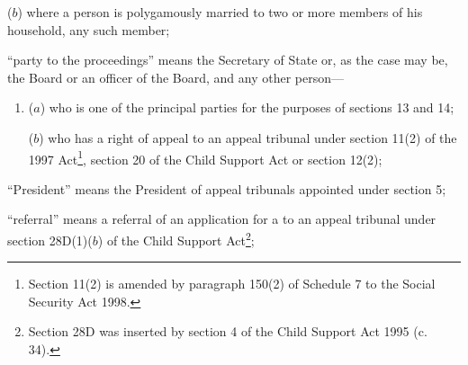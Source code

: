 \documentclass[12pt,a4paper]{article}
\begin{document}
\begin{enumerate}
\begin{enumerate}
    ($b$) 
    where a person is polygamously married to two or more members of his household, any such member;
\end{enumerate}

“party to the proceedings” means the Secretary of State 
or, as the case may be, the Board or an officer of the Board,  %
and any other person—
\begin{enumerate}\item[]
($a$) who is one of the principal parties for the purposes of sections 13 and 14;

($b$) who has a right of appeal to an appeal tribunal under section 11(2) of the 1997 Act\footnote{\frenchspacing Section 11(2) is amended by paragraph 150(2) of Schedule 7 to the Social Security Act 1998.}, section 20 of the Child Support Act 
%
or section 12(2);
\end{enumerate}

“President” means the President of appeal tribunals appointed under section 5;

“referral” means a referral of an application for a 
%
%
to an appeal tribunal under section 28D(1)($b$) of the Child Support Act\footnote{\frenchspacing Section 28D was inserted by section 4 of the Child Support Act 1995 (c. 34).};



\end{enumerate}
\end{document}
